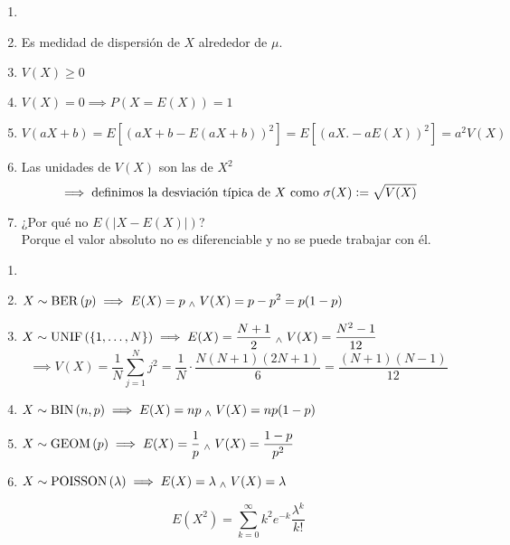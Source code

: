 \begin{obs}
    \begin{enumerate}
        \item[] 
        \item Es medidad de dispersión de $X$ alrededor de $\mu$.
        \item $V(X)\geq 0$
        \item $V(X)=0\implies P(X=E(X))=1$
        \item $V(aX+b)=E[(aX+b-E(aX+b))^2]=E[(aX.-aE(X))^2]=a^2V(X)$
        \item Las unidades de $V(X)$ son las de $X^2$ $$\implies \text{definimos la desviación típica de $X$ como } \sigma(X)\vcentcolon=\sqrt{V(X)}$$
        \item ¿Por qué no $E(|X-E(X)|)$? \\
        Porque el valor absoluto no es diferenciable y no se puede trabajar con él.
    \end{enumerate}
\end{obs}

\begin{ejem}
    \begin{enumerate}
        \item[]
        \item $\displaystyle X\sim\operatorname{BER}\left(p\right) \implies E(X)=p \; _{\wedge} \; V(X)=p-p^2=p(1-p)$
        \item $\displaystyle X\sim \operatorname{UNIF}\left(\{1, \dots, N\}\right) \implies E(X)=\frac{N+1}{2} \; _{\wedge} \; V(X)=\frac{N^2-1}{12}$
        \[\implies V(X)=\frac{1}{N}\sum_{j=1}^N j^2=\frac{1}{N}\cdot\frac{N(N+1)(2N+1)}{6}=\frac{(N+1)(N-1)}{12}\]
        \item $\displaystyle X\sim\operatorname{BIN}\left(n, p\right) \implies E(X)=np \; _{\wedge} \; V(X)=np(1-p)$
        \begin{dem}
            
        \end{dem}
        \item $\displaystyle X\sim\operatorname{GEOM}\left(p\right) \implies E(X)=\frac{1}{p} \; _{\wedge} \; V(X)=\frac{1-p}{p^2}$
        \begin{dem}
            
        \end{dem}
        \item $X\sim\operatorname{POISSON}\left(\lambda\right) \implies E(X)=\lambda \; _{\wedge} \; V(X)=\lambda$
        \begin{dem}
            \[E(X^2)=\sum_{k=0}^{\infty} k^2 e^{-k}\frac{\lambda^k}{k!}\]
        \end{dem}
    \end{enumerate}
\end{ejem}

\begin{defn}[Momentos de $X$]
    
\end{defn}



